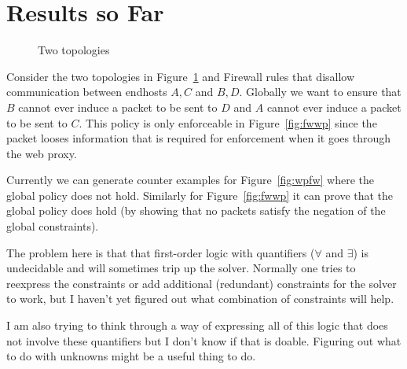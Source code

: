 \documentclass[11pt]{article}
\begin{document}
\section{Results so Far}
\begin{figure}[!h]
\begin{center}
\caption{Two topologies}
\label{fig:topologies}
\end{center}
\end{figure}
Consider the two topologies in Figure~\ref{fig:topologies} and Firewall rules that disallow communication between
endhosts $A, C$ and $B, D$. Globally we want to ensure that $B$ cannot ever induce a packet to be sent to $D$ and $A$
cannot ever induce a packet to be sent to $C$. This policy is only enforceable in Figure~\ref{fig:fwwp} since the packet
looses information that is required for enforcement when it goes through the web proxy.

Currently we can generate counter examples for Figure~\ref{fig:wpfw} where the global policy does
not hold. Similarly for Figure~\ref{fig:fwwp} it can prove that the global policy does hold (by showing that no packets
satisfy the negation of the global constraints).

The problem here is that that first-order logic with quantifiers ($\forall$ and $\exists$) is
undecidable and will sometimes trip up the solver. Normally one tries to reexpress the constraints or add additional
(redundant) constraints for the solver to work, but I haven't yet figured out what combination of constraints will help.

 I am also trying to think through a way of expressing all of this logic that does not
involve these quantifiers but I don't know if that is doable. Figuring out what to do with unknowns might be a useful
thing to do.
\end{document}
